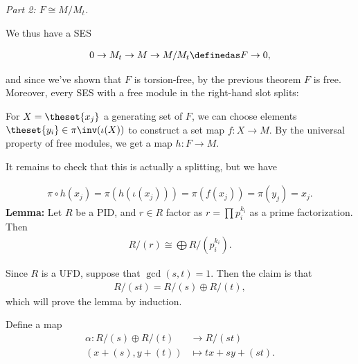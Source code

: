 \emph{Part 2: \(F \cong M/M_t\).}

We thus have a SES

\begin{align*}
0 \to M_t \to M \to M/M_t \definedas F \to 0
,\end{align*}

and since we've shown that \(F\) is torsion-free, by the previous
theorem \(F\) is free. Moreover, every SES with a free module in the
right-hand slot splits:

\begin{center}
\end{center}

For \(X = \theset{x_j}\) a generating set of \(F\), we can choose
elements \(\theset{y_i} \in \pi\inv(\iota(X))\) to construct a set map
\(f: X \to M\). By the universal property of free modules, we get a map
\(h: F \to M\).

It remains to check that this is actually a splitting, but we have

\begin{align*}
\pi \circ h (x_j) = \pi(h(\iota(x_j))) = \pi(f(x_j)) = \pi(y_j) = x_j.
\end{align*} \textbf{Lemma:} Let \(R\) be a PID, and \(r\in R\) factor
as \(r = \prod p_i^{k_i}\) as a prime factorization. Then
\begin{align*}
R/(r) \cong \bigoplus R/(p_i^{k_i}).
\end{align*}

Since \(R\) is a UFD, suppose that \(\gcd(s ,t) = 1\). Then the claim is
that
\begin{align*}
R/(st) = R/(s) \oplus R/(t)
,\end{align*} which will prove the lemma by induction.

Define a map \begin{align*}
\alpha: R/(s) \oplus R/(t) &\to R/(st) \\
(x + (s), y+(t)) &\mapsto tx + sy + (st)
.\end{align*}

